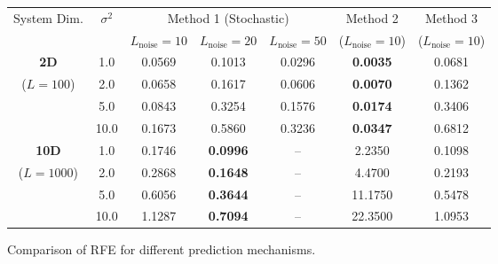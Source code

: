 \begin{Table}[ht]
	\centering
	\small
	\begin{tabular}{|c|c|c|c|c|c|c|}
		\hline
		System Dim. & $\sigma^2$ & \multicolumn{3}{c|}{Method 1 (Stochastic)} & Method 2 & Method 3 \\ \cline{3-5}
		& & $L_{\mathrm{noise}}=10$ & $L_{\mathrm{noise}}=20$ & $L_{\mathrm{noise}}=50$ & ($L_{\mathrm{noise}}=10$) & ($L_{\mathrm{noise}}=10$) \\ \hline
		\textbf{2D}  & 1.0  & 0.0569 & 0.1013 & 0.0296 & \textbf{0.0035} & 0.0681 \\ \cline{2-7}
		($L=100$)    & 2.0  & 0.0658 & 0.1617 & 0.0606 & \textbf{0.0070} & 0.1362 \\ \cline{2-7}
		& 5.0  & 0.0843 & 0.3254 & 0.1576 & \textbf{0.0174} & 0.3406 \\ \cline{2-7}
		& 10.0 & 0.1673 & 0.5860 & 0.3236 & \textbf{0.0347} & 0.6812 \\ \hline
		\textbf{10D} & 1.0  & 0.1746 & \textbf{0.0996} & --     & 2.2350 & 0.1098 \\ \cline{2-7}
		($L=1000$)   & 2.0  & 0.2868 & \textbf{0.1648} & --     & 4.4700 & 0.2193 \\ \cline{2-7}
		& 5.0  & 0.6056 & \textbf{0.3644} & --     & 11.1750 & 0.5478 \\ \cline{2-7}
		& 10.0 & 1.1287 & \textbf{0.7094} & --     & 22.3500 & 1.0953 \\ \hline
	\end{tabular}
	\caption{Comparison of RFE for different prediction mechanisms.}
	\label{tab:cov_error}
\end{Table}

